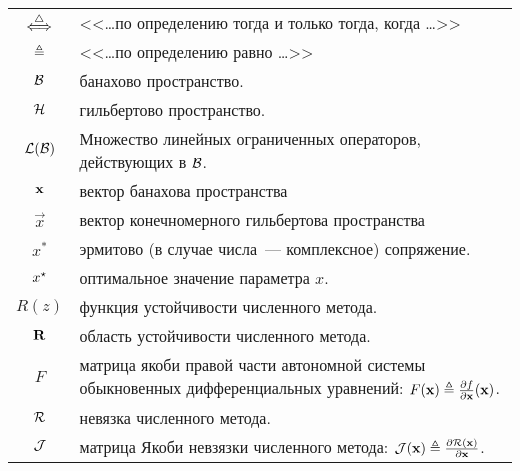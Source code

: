 \label{chapter:definitions} 

\begin{center}
    \begin{tabularx}{\textwidth}{cl}
        $ \overset{\triangle}{\Longleftrightarrow} $                      & <<\ldots по определению тогда и только тогда, когда \ldots>> \\
        $ \triangleq $                       & <<\ldots по определению равно \ldots>> \\
        \rule{0pt}{16pt}%
        $ \mathcal{B} $                 & банахово пространство. \\
        $ \mathcal{H} $                & гильбертово пространство. \\
        $ \mathcal{L}(\mathcal{B}) $      & \makecell[l]{Множество линейных ограниченных операторов, \\
                                                        действующих в $ \mathcal{B} $.} \\
        $ \mathbf{x} $                     & вектор банахова пространства \\
        $ \vec{x} $                      & вектор конечномерного гильбертова пространства \\
        $ x^* $                          & эрмитово (в случае числа~--- комплексное) сопряжение. \\
        $ x^\star $                   & оптимальное значение параметра $ x $. \\
        \rule{0pt}{16pt}%
        $ R(z) $                         & функция устойчивости численного метода. \\
        $ \mathbf{R} $                     & область устойчивости численного метода. \\
        $ F $                            & \makecell[l]{матрица якоби правой части автономной системы \\
                                                        обыкновенных дифференциальных уравнений:
                                                        $ F(\mathbf{x}) \triangleq \frac{\partial f}{\partial \mathbf{x}}(\mathbf{x}) $.} \\
        $ \mathcal{R} $                         & невязка численного метода. \\
        $ \mathcal{J} $                         & матрица Якоби невзязки численного метода:
                                           $ \mathcal{J}(\mathbf{x}) \triangleq \frac{\partial \mathcal{R}(\mathbf{x})}{\partial \mathbf{x}} $. \\

\end{tabularx}
\end{center}
